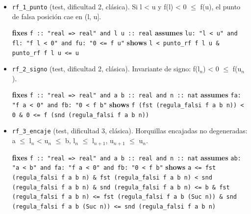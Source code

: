 \documentclass[11pt,a4paper]{article}
\begin{document}
\begin{itemize}
  \item \texttt{rf\_\allowbreak{}1\_\allowbreak{}punto} (test, dificultad 2, clásica). Si l < u y f(l) < 0 $\le $ f(u), el punto de falsa posición cae en (l, u].\\
  {\footnotesize \textbf{fixes} \texttt{f :\allowbreak{}:\allowbreak{} "real =\allowbreak{}> real" and l u :\allowbreak{}:\allowbreak{} real} \textbf{assumes} \texttt{lu:\allowbreak{} "l < u" and fl:\allowbreak{} "f l < 0" and fu:\allowbreak{} "0 <=\allowbreak{} f u"} \textbf{shows} \texttt{l < punto\_\allowbreak{}rf f l u \&\allowbreak{} punto\_\allowbreak{}rf f l u <=\allowbreak{} u}\par}
  \item \texttt{rf\_\allowbreak{}2\_\allowbreak{}signo} (test, dificultad 2, clásica). Invariante de signo: f(l$_{n}$) < 0 $\le $ f(u$_{n}$).\\
  {\footnotesize \textbf{fixes} \texttt{f :\allowbreak{}:\allowbreak{} "real =\allowbreak{}> real" and a b :\allowbreak{}:\allowbreak{} real and n :\allowbreak{}:\allowbreak{} nat} \textbf{assumes} \texttt{fa:\allowbreak{} "f a < 0" and fb:\allowbreak{} "0 < f b"} \textbf{shows} \texttt{f (\allowbreak{}fst (\allowbreak{}regula\_\allowbreak{}falsi f a b n)) < 0 \&\allowbreak{} 0 <=\allowbreak{} f (\allowbreak{}snd (\allowbreak{}regula\_\allowbreak{}falsi f a b n))}\par}
  \item \texttt{rf\_\allowbreak{}3\_\allowbreak{}encaje} (test, dificultad 3, clásica). Horquillas encajadas no degeneradas: a $\le $ l$_{n}$ < u$_{n}$ $\le $ b, l$_{n}$ $\le $ l$_{n+1}$, u$_{n+1}$ $\le $ u$_{n}$.\\
  {\footnotesize \textbf{fixes} \texttt{f :\allowbreak{}:\allowbreak{} "real =\allowbreak{}> real" and a b :\allowbreak{}:\allowbreak{} real and n :\allowbreak{}:\allowbreak{} nat} \textbf{assumes} \texttt{ab:\allowbreak{} "a < b" and fa:\allowbreak{} "f a < 0" and fb:\allowbreak{} "0 < f b"} \textbf{shows} \texttt{a <=\allowbreak{} fst (\allowbreak{}regula\_\allowbreak{}falsi f a b n) \&\allowbreak{} fst (\allowbreak{}regula\_\allowbreak{}falsi f a b n) < snd (\allowbreak{}regula\_\allowbreak{}falsi f a b n) \&\allowbreak{} snd (\allowbreak{}regula\_\allowbreak{}falsi f a b n) <=\allowbreak{} b \&\allowbreak{} fst (\allowbreak{}regula\_\allowbreak{}falsi f a b n) <=\allowbreak{} fst (\allowbreak{}regula\_\allowbreak{}falsi f a b (\allowbreak{}Suc n)) \&\allowbreak{} snd (\allowbreak{}regula\_\allowbreak{}falsi f a b (\allowbreak{}Suc n)) <=\allowbreak{} snd (\allowbreak{}regula\_\allowbreak{}falsi f a b n)}\par}

\end{itemize}
\end{document}
